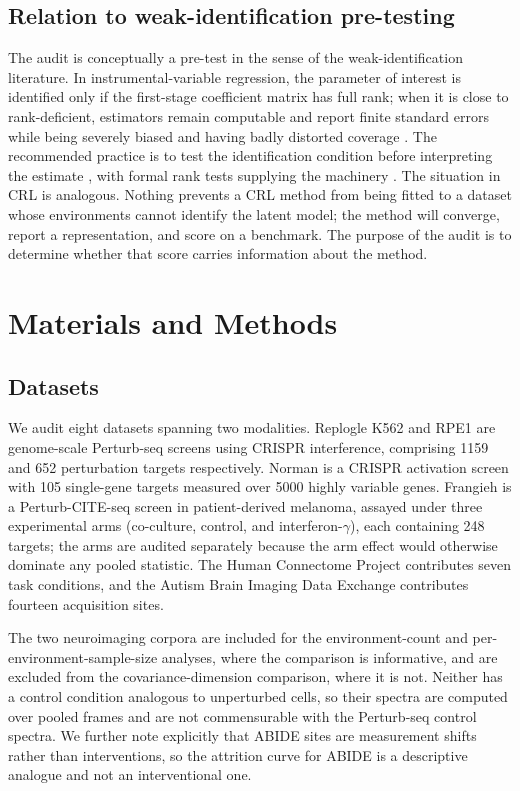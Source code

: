 \documentclass[journal,twoside,web]{ieeecolor}
\begin{document}
\subsection{Relation to weak-identification pre-testing}
The audit is conceptually a pre-test in the sense of the weak-identification
literature. In instrumental-variable regression, the parameter of interest is
identified only if the first-stage coefficient matrix has full rank; when it
is close to rank-deficient, estimators remain computable and report finite
standard errors while being severely biased and having badly distorted
coverage \cite{staiger1997}. The recommended practice is to test the
identification condition before interpreting the estimate \cite{stock2005},
with formal rank tests supplying the machinery
\cite{kleibergen2006,robin2000,chen2019}. The situation in CRL is analogous.
Nothing prevents a CRL method from being fitted to a dataset whose
environments cannot identify the latent model; the method will converge,
report a representation, and score on a benchmark. The purpose of the audit is
to determine whether that score carries information about the method.

\section{Materials and Methods}
\label{sec:methods}

\subsection{Datasets}
We audit eight datasets spanning two modalities. Replogle K562 and RPE1
\cite{replogle2022} are genome-scale Perturb-seq screens using CRISPR
interference, comprising 1159 and 652 perturbation targets respectively.
Norman \cite{norman2019} is a CRISPR activation screen with 105 single-gene
targets measured over 5000 highly variable genes. Frangieh
\cite{frangieh2021} is a Perturb-CITE-seq screen in patient-derived melanoma,
assayed under three experimental arms (co-culture, control, and
interferon-$\gamma$), each containing 248 targets; the arms are audited
separately because the arm effect would otherwise dominate any pooled
statistic. The Human Connectome Project \cite{vanessen2013} contributes seven
task conditions, and the Autism Brain Imaging Data Exchange
\cite{dimartino2014} contributes fourteen acquisition sites.

The two neuroimaging corpora are included for the environment-count and
per-environment-sample-size analyses, where the comparison is informative, and
are excluded from the covariance-dimension comparison, where it is not.
Neither has a control condition analogous to unperturbed cells, so their
spectra are computed over pooled frames and are not commensurable with the
Perturb-seq control spectra. We further note explicitly that ABIDE sites are
measurement shifts rather than interventions, so the attrition curve for ABIDE
is a descriptive analogue and not an interventional one.
\end{document}
